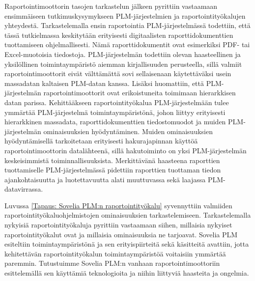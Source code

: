 Raportointimoottorin tasojen tarkastelun jälkeen pyrittiin vastaamaan ensimmäiseen tutkimuskysymykseen PLM-järjestelmien ja raportointityökalujen yhteydestä. Tarkastelemalla ensin raportointia PLM-järjestelmässä todettiin, että tässä tutkielmassa keskitytään erityisesti digitaalisten raporttidokumenttien tuottamiseen ohjelmallisesti. Nämä raporttidokumentit ovat esimerkiksi PDF- tai Excel-muotoisia tiedostoja. PLM-järjestelmän todettiin olevan haasteellinen ja yksilöllinen toimintaympäristö aiemman kirjallisuuden perusteella, sillä valmiit raportointimoottorit eivät välttämättä sovi sellaisenaan käytettäväksi usein massadatan kaltaisen PLM-datan kanssa. \cite{rohleder_requirements_2014} Lisäksi huomattiin, että PLM-järjestelmän raportointimoottorit ovat erikoistuneita toimimaan hierarkkisen datan parissa. \cite{rohleder_requirements_2014} Kehittääkseen raportointityökalua PLM-järjestelmään tulee ymmärtää PLM-järjestelmä toimintaympäristönä, johon liittyy erityisesti hierarkkinen massadata, raporttidokumenttien tiedostomuodot ja muiden PLM-järjestelmän ominaisuuksien hyödyntäminen. Muiden ominaisuuksien hyödyntämisellä tarkoitetaan erityisesti hakurajapinnan käyttöä raportointimoottorin datalähteenä, sillä hakutoiminto on yksi PLM-järjestelmän keskeisimmistä toiminnallisuuksista. \cite{enriquez_approach_2019} Merkittävänä haasteena raporttien tuottamiselle PLM-järjestelmässä pidettiin raporttien tuottaman tiedon ajankohtaisuutta ja luotettavuutta alati muuttuvassa sekä laajassa PLM-datavirrassa. \cite{german_challenge_2016} 

Luvussa \ref{Tapaus: Sovelia PLM:n raportointityökalu} syvennyttiin valmiiden raportointityökaluohjelmistojen ominaisuuksien tarkastelemiseen. Tarkastelemalla nykyisiä raportointityökaluja pyrittiin vastaamaan siihen, millaisia nykyiset raportointityökalut ovat ja millaisia ominaisuuksia ne tarjoavat. Sovelia PLM esiteltiin toimintaympäristönä ja sen erityispiirteitä sekä käsitteitä avattiin, jotta kehitettävän raportointityökalun toimintaympäristöä voitaisiin ymmärtää paremmin. Tutustuimme Sovelia PLM:n vanhaan raportointimoottoriin esittelemällä sen käyttämiä teknologioita ja niihin liittyviä haasteita ja ongelmia. 
